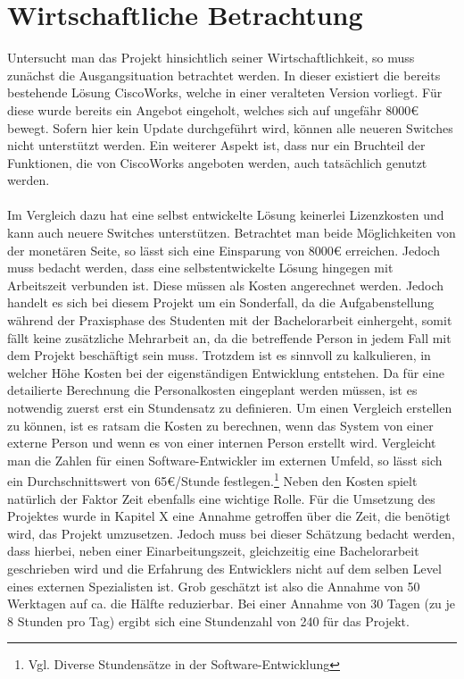 \section{Wirtschaftliche Betrachtung}
\label{sec:economicloverview}

Untersucht man das Projekt hinsichtlich seiner Wirtschaftlichkeit, so muss zunächst die Ausgangsituation betrachtet werden. In dieser existiert die bereits bestehende Lösung CiscoWorks, welche in einer veralteten Version vorliegt. Für diese wurde bereits ein Angebot eingeholt, welches sich auf ungefähr 8000€ bewegt. Sofern hier kein Update durchgeführt wird, können alle neueren Switches nicht unterstützt werden.
Ein weiterer Aspekt ist, dass nur ein Bruchteil der Funktionen, die von CiscoWorks angeboten werden, auch tatsächlich genutzt werden.\\\\
Im Vergleich dazu hat eine selbst entwickelte Lösung keinerlei Lizenzkosten und kann auch neuere Switches unterstützen. Betrachtet man beide Möglichkeiten von der monetären Seite, so lässt sich eine Einsparung von 8000€ erreichen. Jedoch muss bedacht werden, dass eine selbstentwickelte Lösung hingegen mit Arbeitszeit  verbunden ist.  Diese müssen als Kosten angerechnet werden. Jedoch handelt es sich bei diesem Projekt um ein Sonderfall, da die Aufgabenstellung während der Praxisphase des Studenten mit der Bachelorarbeit einhergeht, somit fällt keine zusätzliche Mehrarbeit an, da die betreffende Person in jedem Fall mit dem Projekt beschäftigt sein muss.
Trotzdem ist es sinnvoll zu kalkulieren, in welcher Höhe Kosten bei der eigenständigen Entwicklung entstehen.
Da für eine detailierte Berechnung die Personalkosten eingeplant werden müssen, ist es notwendig zuerst erst ein Stundensatz zu definieren.
Um einen Vergleich erstellen zu können, ist es ratsam die Kosten zu berechnen, wenn das System von einer externe Person und wenn es von einer internen Person erstellt wird.
Vergleicht man die Zahlen für einen Software-Entwickler im externen Umfeld, so lässt sich ein Durchschnittswert von 65€/Stunde festlegen.\footnote{Vgl. Diverse Stundensätze in der Software-Entwicklung}
Neben den Kosten spielt natürlich der Faktor Zeit ebenfalls eine wichtige Rolle. Für die Umsetzung des Projektes wurde in Kapitel X eine Annahme getroffen über die Zeit, die benötigt wird, das Projekt umzusetzen. Jedoch muss bei dieser Schätzung bedacht werden, dass hierbei, neben einer Einarbeitungszeit, gleichzeitig eine Bachelorarbeit geschrieben wird und die Erfahrung des Entwicklers nicht auf dem selben Level eines externen Spezialisten ist. Grob geschätzt ist also die Annahme von 50 Werktagen auf ca. die Hälfte reduzierbar. Bei einer Annahme von 30 Tagen (zu je 8 Stunden pro Tag) ergibt sich eine Stundenzahl von 240 für das Projekt.
